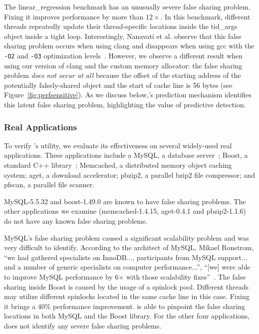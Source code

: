 The linear\_regression benchmark has an unusually severe false sharing problem. Fixing it improves performance by more than $12\times$. In this benchmark, different threads repeatedly update their thread-specific locations inside the tid\_args object inside a tight loop. Interestingly, Nanavati et al. observe that this false sharing problem occurs when using clang and disappears when using gcc with the \texttt{-O2} and \texttt{-O3} optimization levels~\cite{OSdetection}. However, we observe a different result when using our version of clang and the custom memory allocator: the false sharing problem \emph{does not occur at all} because the offset of the starting address of the potentially falsely-shared object and the start of cache line is 56 bytes (see Figure~\ref{fig:perfsensitive}). As we discuss below,\Predator{}'s prediction mechanism identifies this latent false sharing problem, highlighting the value of predictive detection.

\subsubsection{Real Applications}
To verify \Predator{}'s utility, we evaluate its effectiveness on several widely-used real applications. These applications include a MySQL, a database server~\cite{mysql};
Boost, a standard C++ library~\cite{libfalsesharing};
Memcached, a distributed memory object caching system; aget, a download accelerator;
pbzip2, a parallel bzip2 file compressor; and pfscan, a parallel file scanner.

MySQL-5.5.32 and boost-1.49.0 are known to have false sharing problems. The other applications we examine (memcached-1.4.15, aget-0.4.1 and pbzip2-1.1.6) do not have  any known false sharing problems.

MySQL's false sharing problem caused a significant scalability problem and was very difficult to identify.
According to the architect of MySQL, Mikael Ronstrom, ``we had gathered specialists on InnoDB..., participants from MySQL support... and a number of generic specialists on 
computer performance...'', ``[we] were able to improve MySQL performance by 6$\times$ with those scalability fixes''~\cite{mysql}. 
The false sharing inside Boost is caused by the usage of a spinlock pool. Different threads may utilize different spinlocks located in the same cache line in this case. Fixing it brings a 40\% performance improvement.
\Predator{} is able to pinpoint the false sharing locations in both MySQL and the Boost library. 
For the other four applications, \Predator{} does not identify any severe false sharing problems.

